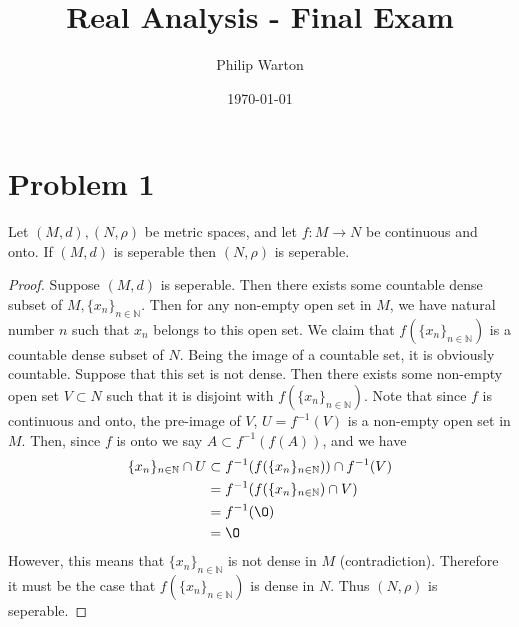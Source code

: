 \documentclass{article}
\theoremstyle{definition}
\begin{document}
\title{Real Analysis - Final Exam}
\author{Philip Warton}
\date{\today}
\maketitle
\section*{Problem 1}
\begin{mdframed}
    Let $(M,d), (N,\rho)$ be metric spaces, and let $f:M \rightarrow N$ be continuous and onto. If $(M,d)$ is
    seperable then $(N, \rho)$ is seperable.
\end{mdframed}
\begin{proof}
    Suppose $(M,d)$ is seperable. Then there exists some countable dense subset of $M, \{x_n\}_{n \in \mathbb{N}}$.
    Then for any non-empty open set in $M$, we have natural number $n$ such that $x_n$ belongs to this open set.
    We claim that $f(\{x_n\}_{n \in \mathbb{N}})$ is a countable dense subset of $N$. Being the image of a countable set,
    it is obviously countable. Suppose that this set is not dense. Then there exists some non-empty open set $V \subset N$ such that it 
    is disjoint with $f(\{x_n\}_{n \in \mathbb{N}})$. Note that since $f$ is continuous and onto, the pre-image of $V$, $U = f^{-1}(V)$
    is a non-empty open set in $M$. Then, since $f$ is onto we say $A \subset f^{-1}(f(A))$, and we have
    \begin{align*}
        \{x_n\}_{n \in \mathbb{N}} \cap U &\subset f^{-1}(f(\{x_n\}_{n \in \mathbb{N}})) \cap f^{-1}(V) \\
        &= f^{-1}(f(\{x_n\}_{n \in \mathbb{N}}) \cap V) \\
        &= f^{-1}(\O)\\
        &= \O
    \end{align*}
    However, this means that $\{x_n\}_{n \in \mathbb{N}}$ is not dense in $M$ (contradiction). Therefore it must be the case 
    that $f(\{x_n\}_{n \in \mathbb{N}})$ is dense in $N$. Thus $(N , \rho)$ is seperable.
\end{proof}
\end{document}
